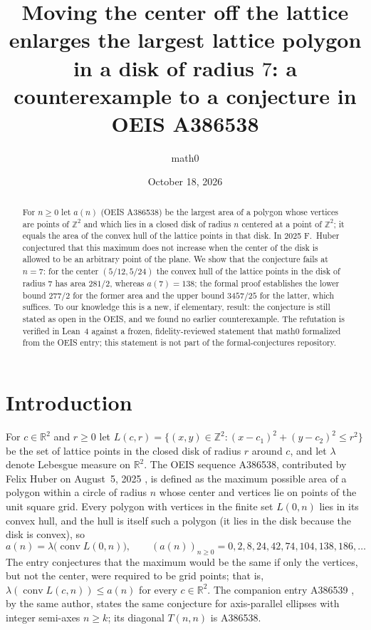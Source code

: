 \documentclass[11pt]{amsart}
\title[A non-lattice center enlarges the largest lattice polygon in a disk]{Moving the center off the lattice enlarges the largest lattice polygon in a disk of radius $7$: a counterexample to a conjecture in OEIS A386538}
\author{math0}
\date{October 18, 2026}
\theoremstyle{plain}
\theoremstyle{definition}
\newcommand{\Z}{\mathbb{Z}}
\newcommand{\R}{\mathbb{R}}
\DeclareMathOperator{\conv}{conv}
\newcommand{\vol}{\lambda}
\begin{document}
\begin{abstract}
For $n\ge0$ let $a(n)$ (OEIS A386538) be the largest area of a polygon whose vertices are points of $\Z^2$ and which lies in a closed disk of radius $n$ centered at a point of $\Z^2$; it equals the area of the convex hull of the lattice points in that disk.
In 2025 F.~Huber conjectured that this maximum does not increase when the center of the disk is allowed to be an arbitrary point of the plane.
We show that the conjecture fails at $n=7$: for the center $(5/12,5/24)$ the convex hull of the lattice points in the disk of radius $7$ has area $281/2$, whereas $a(7)=138$; the formal proof establishes the lower bound $277/2$ for the former area and the upper bound $3457/25$ for the latter, which suffices.
To our knowledge this is a new, if elementary, result: the conjecture is still stated as open in the OEIS, and we found no earlier counterexample.
The refutation is verified in Lean~4 against a frozen, fidelity-reviewed statement that math0 formalized from the OEIS entry; this statement is not part of the formal-conjectures repository.
\end{abstract}
\maketitle

\section{Introduction}

For $c\in\R^2$ and $r\ge0$ let $L(c,r)=\{(x,y)\in\Z^2:(x-c_1)^2+(y-c_2)^2\le r^2\}$ be the set of lattice points in the closed disk of radius $r$ around $c$, and let $\vol$ denote Lebesgue measure on $\R^2$.
The OEIS sequence A386538, contributed by Felix Huber on August~5, 2025 \cite{A386538}, is defined as the maximum possible area of a polygon within a circle of radius $n$ whose center and vertices lie on points of the unit square grid.
Every polygon with vertices in the finite set $L(0,n)$ lies in its convex hull, and the hull is itself such a polygon (it lies in the disk because the disk is convex), so
\[
  a(n)=\vol\bigl(\conv L(0,n)\bigr),\qquad (a(n))_{n\ge0}=0,2,8,24,42,74,104,138,186,\dots
\]
The entry conjectures that the maximum would be the same if only the vertices, but not the center, were required to be grid points; that is, $\vol(\conv L(c,n))\le a(n)$ for every $c\in\R^2$.
The companion entry A386539 \cite{A386539}, by the same author, states the same conjecture for axis-parallel ellipses with integer semi-axes $n\ge k$; its diagonal $T(n,n)$ is A386538.
\end{document}
